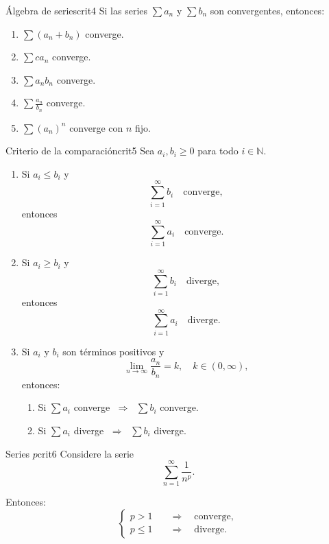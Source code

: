 \begin{teorema}{Álgebra de series}{crit4}
    Si las series $\sum a_n$ y $\sum b_n$ son convergentes, entonces:
    \begin{enumerate}
        \item $\sum (a_n + b_n)$ converge.
        \item $\sum c a_n$ converge.
        \item $\sum a_n b_n$ converge.
        \item $\sum \frac{a_n}{b_n}$ converge.
        \item $\sum (a_n)^n$ converge con $n$ fijo.
    \end{enumerate}
\end{teorema}

\begin{teorema}{Criterio de la comparación}{crit5}
    Sea $a_i, b_i \geq 0$ para todo $i \in \mathbb{N}$.
    \begin{enumerate}
        \item Si $a_i \leq b_i$ y 
        \[
            \sum_{i=1}^{\infty} b_i \quad \text{converge},
        \]
        entonces 
        \[
            \sum_{i=1}^{\infty} a_i \quad \text{converge}.
        \]

        \item Si $a_i \geq b_i$ y 
        \[
            \sum_{i=1}^{\infty} b_i \quad \text{diverge},
        \]
        entonces 
        \[
            \sum_{i=1}^{\infty} a_i \quad \text{diverge}.
        \]

        \item Si $a_i$ y $b_i$ son términos positivos y 
        \[
            \lim_{n \to \infty} \frac{a_n}{b_n} = k, \quad k \in (0,\infty),
        \]
        entonces:
        \begin{enumerate}[label=\roman*)]
            \item Si $\sum a_i$ converge $\;\Rightarrow\;$ $\sum b_i$ converge.
            \item Si $\sum a_i$ diverge $\;\Rightarrow\;$ $\sum b_i$ diverge.
        \end{enumerate}
    \end{enumerate}
\end{teorema}

\begin{teorema}{Series $p$}{crit6}
    Considere la serie
    \[
        \sum_{n=1}^{\infty} \frac{1}{n^p}.
    \]

    Entonces:
    \[
        \begin{cases}
            p > 1 \quad &\Rightarrow \quad \text{converge}, \\
            p \leq 1 \quad &\Rightarrow \quad \text{diverge}.
        \end{cases}
    \]
\end{teorema}

